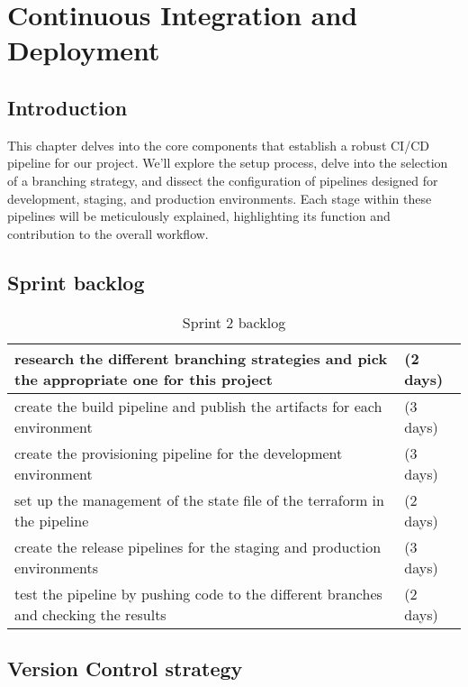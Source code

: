 \chapter{Continuous Integration and Deployment}

\section*{Introduction}
This chapter delves into the core components that establish a robust CI/CD pipeline for our project. We'll explore the setup process, delve into the selection of a branching strategy, and dissect the configuration of pipelines designed for development, staging, and production environments. Each stage within these pipelines will be meticulously explained, highlighting its function and contribution to the overall workflow.
\section{Sprint backlog}
\begin{longtable}[c]{
    |p{}|
    p{}|
    }
    \caption{Sprint 2 backlog}
    \label{tab:Sprint2_backlog}                                                                            \\
    \hline
    research the different branching strategies and pick the appropriate one for this project & (2 days) \\
    \hline
    create the build pipeline and publish the artifacts for each environment                  & (3 days) \\
    \hline
    create the provisioning pipeline for the development environment                          & (3 days) \\
    \hline
    set up the management of the state file of the terraform in the pipeline                  & (2 days) \\
    \hline
    create the release pipelines for the staging and production environments                  & (3 days) \\
    \hline
    test the pipeline by pushing code to the different branches and checking the results      & (2 days) \\
    \hline
\end{longtable}

\section{Version Control strategy}
